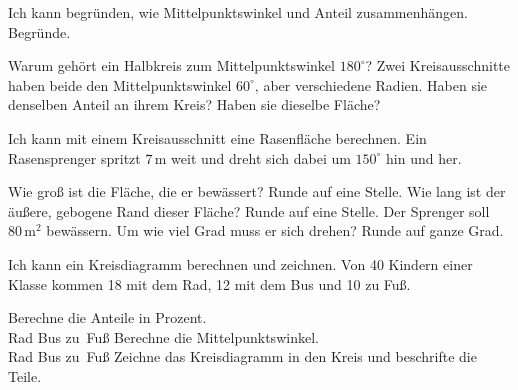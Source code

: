 \begin{aufgabe}{Ich kann begründen, wie Mittelpunktswinkel und Anteil zusammenhängen.}
Begründe.
\begin{teile}
\teil Warum gehört ein Halbkreis zum Mittelpunktswinkel $180^\circ$?
\teil Zwei Kreisausschnitte haben beide den Mittelpunktswinkel $60^\circ$, aber verschiedene Radien. Haben sie denselben Anteil an ihrem Kreis? Haben sie dieselbe Fläche?
\end{teile}
\end{aufgabe}

\begin{aufgabe}{Ich kann mit einem Kreisausschnitt eine Rasenfläche berechnen.}
Ein Rasensprenger spritzt $7\,\text{m}$ weit und dreht sich dabei um $150^\circ$ hin und her.

\begin{kreis}[1.6]\mittelpunkt{}\end{kreis}

\begin{teile}
\teil Wie groß ist die Fläche, die er bewässert? Runde auf eine Stelle. \hfill \leerfeld[m²]
\teil Wie lang ist der äußere, gebogene Rand dieser Fläche? Runde auf eine Stelle. \hfill \leerfeld[m]
\teil Der Sprenger soll $80\,\text{m}^2$ bewässern. Um wie viel Grad muss er sich drehen? Runde auf ganze Grad. \hfill \leerfeld[°]
\end{teile}
\end{aufgabe}

\begin{aufgabe}{Ich kann ein Kreisdiagramm berechnen und zeichnen.}
Von 40 Kindern einer Klasse kommen 18 mit dem Rad, 12 mit dem Bus und 10 zu Fuß.
\begin{teile}
\teil Berechne die Anteile in Prozent. \\ Rad \leerfeld[\%] \quad Bus \leerfeld[\%] \quad zu~Fuß \leerfeld[\%]
\teil Berechne die Mittelpunktswinkel. \\ Rad \leerfeld[°] \quad Bus \leerfeld[°] \quad zu~Fuß \leerfeld[°]
\teil Zeichne das Kreisdiagramm in den Kreis und beschrifte die Teile.
\end{teile}

\kreisleer[2.2]

\end{aufgabe}
